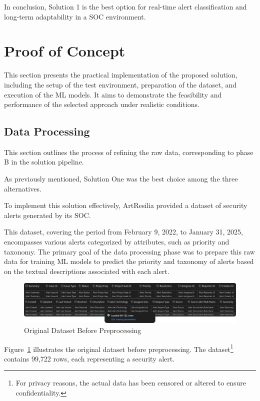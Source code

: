 In conclusion, Solution 1 is the best option for real-time alert classification and long-term adaptability in a SOC environment.

\section{Proof of Concept}
This section presents the practical implementation of the proposed solution, including the setup of the test environment, preparation of the dataset, and execution of the ML models. It aims to demonstrate the feasibility and performance of the selected approach under realistic conditions.

\subsection{Data Processing}
This section outlines the process of refining the raw data, corresponding to phase B in the solution pipeline.

As previously mentioned, Solution One was the best choice among the three alternatives.

To implement this solution effectively, ArtResilia provided a dataset of security alerts generated by its SOC. 

This dataset, covering the period from February 9, 2022, to January 31, 2025, encompasses various alerts categorized by attributes, such as priority and taxonomy. 
The primary goal of the data processing phase was to prepare this raw data for training ML models to predict the priority and taxonomy of alerts based on the textual descriptions associated with each alert.

\begin{figure}[h!]
    \centering
    \includegraphics[width=\textwidth]{ch3/assets/dataset_original.png}
    \caption{Original Dataset Before Preprocessing}
    \label{fig:dataset_original}
\end{figure}

Figure~\ref{fig:dataset_original} illustrates the original dataset before preprocessing.
The dataset\footnote{For privacy reasons, the actual data has been censored or altered to ensure confidentiality.} contains 99,722 rows, each representing a security alert.

